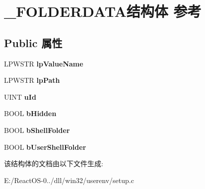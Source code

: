 \hypertarget{struct___f_o_l_d_e_r_d_a_t_a}{}\section{\+\_\+\+F\+O\+L\+D\+E\+R\+D\+A\+T\+A结构体 参考}
\label{struct___f_o_l_d_e_r_d_a_t_a}
\subsection*{Public 属性}
\begin{DoxyCompactItemize}
\item 
\mbox{\label{struct___f_o_l_d_e_r_d_a_t_a_a66a80a8c0c6b8657567fb01c0edd18a5}} 
L\+P\+W\+S\+TR {\bfseries lp\+Value\+Name}
\item 
\mbox{\label{struct___f_o_l_d_e_r_d_a_t_a_a3b5fba047e6833bc91248929c3b5df74}} 
L\+P\+W\+S\+TR {\bfseries lp\+Path}
\item 
\mbox{\label{struct___f_o_l_d_e_r_d_a_t_a_a0c834177729884ac7167088453cfa64e}} 
U\+I\+NT {\bfseries u\+Id}
\item 
\mbox{\label{struct___f_o_l_d_e_r_d_a_t_a_a0eafc978dae13eb69c7d4436775361e1}} 
B\+O\+OL {\bfseries b\+Hidden}
\item 
\mbox{\label{struct___f_o_l_d_e_r_d_a_t_a_adf66f727a47aaa206245be63a89f0936}} 
B\+O\+OL {\bfseries b\+Shell\+Folder}
\item 
\mbox{\label{struct___f_o_l_d_e_r_d_a_t_a_a96d5db9086e495aa4249a0ca2c69a4bf}} 
B\+O\+OL {\bfseries b\+User\+Shell\+Folder}
\end{DoxyCompactItemize}


该结构体的文档由以下文件生成\+:\begin{DoxyCompactItemize}
\item 
E\+:/\+React\+O\+S-\/0../dll/win32/userenv/setup.\+c\end{DoxyCompactItemize}
